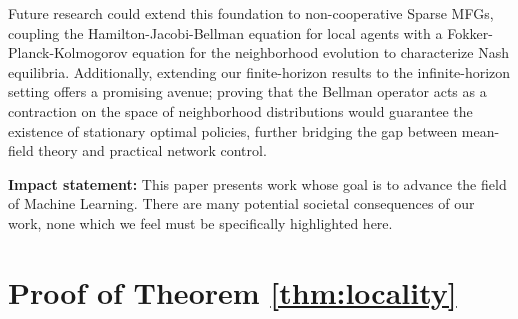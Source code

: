 \documentclass{article}
\begin{document}
Future research could extend this foundation to non-cooperative Sparse MFGs, coupling the Hamilton-Jacobi-Bellman equation for local agents with a Fokker-Planck-Kolmogorov equation for the neighborhood evolution to characterize Nash equilibria. Additionally, extending our finite-horizon results to the infinite-horizon setting offers a promising avenue; proving that the Bellman operator acts as a contraction on the space of neighborhood distributions would guarantee the existence of stationary optimal policies, further bridging the gap between mean-field theory and practical network control.


\clearpage
\noindent\textbf{Impact statement:} This paper presents work whose goal is to advance the field of Machine Learning. There are many potential societal consequences of our work, none which we feel must be specifically highlighted here.




\newpage
\appendix
\onecolumn
\section{Proof of Theorem \ref{thm:locality}}
\end{document}
